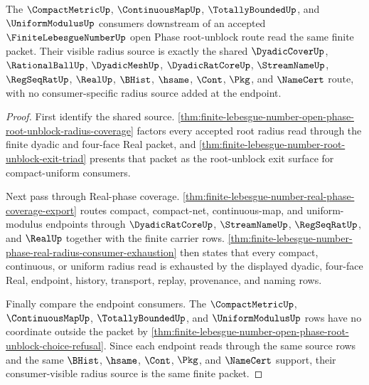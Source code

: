 \begin{theorem}
\label{thm:finite-lebesgue-number-open-phase-root-unblock-consumer-readback}
The $\CompactMetricUp$, $\ContinuousMapUp$, $\TotallyBoundedUp$, and $\UniformModulusUp$ consumers downstream of an accepted $\FiniteLebesgueNumberUp$ open Phase root-unblock route read the same finite packet. Their visible radius source is exactly the shared $\DyadicCoverUp$, $\RationalBallUp$, $\DyadicMeshUp$, $\DyadicRatCoreUp$, $\StreamNameUp$, $\RegSeqRatUp$, $\RealUp$, $\BHist$, $\hsame$, $\Cont$, $\Pkg$, and $\NameCert$ route, with no consumer-specific radius source added at the endpoint.
\end{theorem}
\begin{proof}
First identify the shared source. \autoref{thm:finite-lebesgue-number-open-phase-root-unblock-radius-coverage} factors every accepted root radius read through the finite dyadic and four-face Real packet, and \autoref{thm:finite-lebesgue-number-root-unblock-exit-triad} presents that packet as the root-unblock exit surface for compact-uniform consumers.

Next pass through Real-phase coverage. \autoref{thm:finite-lebesgue-number-real-phase-coverage-export} routes compact, compact-net, continuous-map, and uniform-modulus endpoints through $\DyadicRatCoreUp$, $\StreamNameUp$, $\RegSeqRatUp$, and $\RealUp$ together with the finite carrier rows. \autoref{thm:finite-lebesgue-number-phase-real-radius-consumer-exhaustion} then states that every compact, continuous, or uniform radius read is exhausted by the displayed dyadic, four-face Real, endpoint, history, transport, replay, provenance, and naming rows.

Finally compare the endpoint consumers. The $\CompactMetricUp$, $\ContinuousMapUp$, $\TotallyBoundedUp$, and $\UniformModulusUp$ rows have no coordinate outside the packet by \autoref{thm:finite-lebesgue-number-open-phase-root-unblock-choice-refusal}. Since each endpoint reads through the same source rows and the same $\BHist$, $\hsame$, $\Cont$, $\Pkg$, and $\NameCert$ support, their consumer-visible radius source is the same finite packet.
\end{proof}

